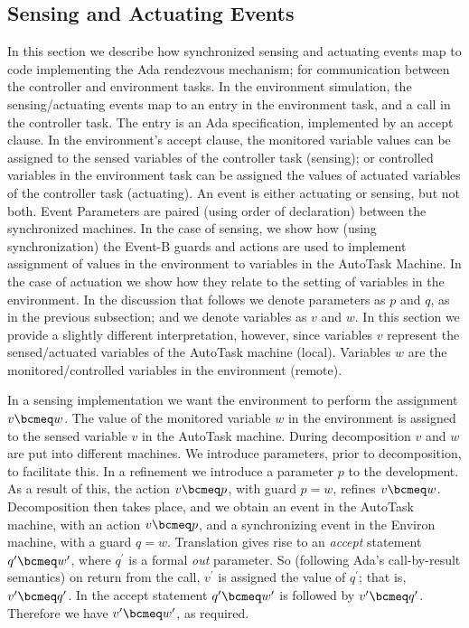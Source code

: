 \subsection{Sensing and Actuating Events}\label{formalSense}
In this section we describe how synchronized sensing and actuating events map to code implementing the Ada rendezvous mechanism; for communication between the controller and environment tasks. In the environment simulation, the sensing/actuating events map to an entry in the environment task, and a call in the controller task. The entry is an Ada specification, implemented by an accept clause. In the environment's accept clause, the monitored variable values can be assigned to the sensed variables of the controller task (sensing); or controlled variables in the environment task can be assigned the values of actuated variables of the controller task (actuating). An event is either actuating or sensing, but not both. Event Parameters are paired (using order of declaration) between the synchronized machines. In the case of sensing, we show how (using synchronization) the Event-B guards and actions are used to implement assignment of values in the environment to variables in the AutoTask Machine. In the case of actuation we show how they relate to the setting of variables in the environment. 
%
In the discussion that follows we denote parameters as $p$ and $q$, as in the previous subsection; and we denote variables as $v$ and $w$. In this section we provide a slightly different interpretation, however, since variables $v$ represent the sensed/actuated variables of the AutoTask machine (local). Variables $w$ are the monitored/controlled variables in the environment (remote).

In a sensing implementation we want the environment to perform the assignment $v \bcmeq w$. The value of the monitored variable $w$ in the environment is assigned to the sensed variable $v$ in the AutoTask machine. During decomposition $v$ and $w$ are put into different machines. We introduce parameters, prior to decomposition, to facilitate this. In a refinement we introduce a parameter $p$ to the development. As a result of this, the action $v\bcmeq p$, with guard $p=w$, refines $v \bcmeq w$. Decomposition then takes place, and we obtain an event in the AutoTask machine, with an action $v \bcmeq p$, and a synchronizing event in the Environ machine, with a guard $q=w$.  Translation gives rise to an \emph{accept} statement $q^\prime \bcmeq w^\prime$, where $q^\prime$ is a formal \emph{out} parameter. So (following Ada's call-by-result semantics) on return from the call, $v^\prime$ is assigned the value of $q^\prime$; that is, $v^\prime\bcmeq q^\prime$. In the accept statement $q^\prime \bcmeq w^\prime$ is followed by $v^\prime\bcmeq q^\prime$. Therefore we have $v^\prime \bcmeq w^\prime$, as required.

